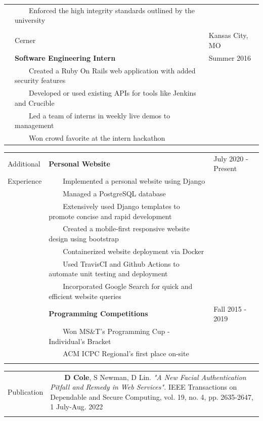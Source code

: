 \documentclass[10pt]{article}
\newcommand{\tabitem}{~~\llap{\textbullet}~~}
\newenvironment{entries}{\begin{tabular}{p{1.5cm} p{13.2cm} l}}{\end{tabular}}
\begin{document}
\begin{longtable}{p{1.5cm} p{13.2cm} l}
           & \tabitem Enforced the high integrity standards outlined by the university \\ \\
%
           & Cerner & Kansas City, MO \\
           & \textbf{Software Engineering Intern} & Summer 2016 \\
           & \tabitem Created a Ruby On Rails web application with added security features \\
           & \tabitem Developed or used existing APIs for tools like Jenkins and Crucible \\
           & \tabitem Led a team of interns in weekly live demos to management \\
           & \tabitem Won crowd favorite at the intern hackathon \\
\end{longtable}


\begin{entries}
Additional & \textbf{Personal Website} & July 2020 - Present \\
Experience & \tabitem Implemented a personal website using Django \\
           & \tabitem Managed a PostgreSQL database \\
           & \tabitem Extensively used Django templates to promote concise and rapid development \\
           & \tabitem Created a mobile-first responsive website design using bootstrap \\
           & \tabitem Containerized website deployment via Docker \\
           & \tabitem Used TravisCI and Github Actions to automate unit testing and deployment \\
           & \tabitem Incorporated Google Search for quick and efficient website queries \\
%
           & \textbf{Programming Competitions} & Fall 2015 - 2019 \\
           & \tabitem Won MS\&T's Programming Cup - Individual's Bracket \\
           & \tabitem ACM ICPC Regional's first place on-site \\
\\
\end{entries}


\begin{tabular}{p{1.5cm} p{16.5cm}}
Publication & \tabitem \textbf{D Cole}, S Newman, D Lin. \textit{"A New Facial Authentication Pitfall and Remedy in Web Services".} IEEE Transactions on Dependable and Secure Computing, vol. 19, no. 4, pp. 2635-2647, 1 July-Aug. 2022 \\ \\
\end{tabular}
\end{document}
